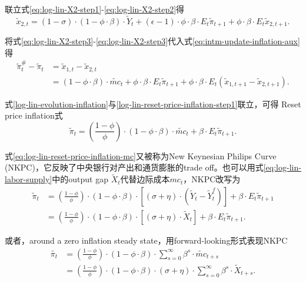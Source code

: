 联立式\eqref{eq:log-lin-X2-step1}-\eqref{eq:log-lin-X2-step2}得
\begin{equation}
  \label{eq:log-lin-X2-step3}
  \tilde{x}_{2,t} = (1-\sigma) \cdot (1-\phi \cdot \beta) \cdot \tilde{Y}_t+ (\epsilon - 1) \cdot \phi \cdot \beta \cdot E_t \tilde{\pi}_{t+1} + \phi \cdot \beta \cdot E_t \tilde{x}_{2,t+1}.
\end{equation}

将式\eqref{eq:log-lin-X2-step3}-\eqref{eq:log-lin-X2-step3}代入式\eqref{eq:intm-update-inflation-aux}得
\begin{align}
\label{log-lin-reset-price-inflation-step1}
  \tilde{\pi}^{\#}_t - \tilde{\pi}_t &= \tilde{x}_{1,t}-\tilde{x}_{2,t} \nonumber \\
                     &=(1-\phi \cdot \beta) \cdot \tilde{mc}_t + \phi \cdot \beta \cdot E_t \tilde{\pi}_{t+1} + \phi \cdot \beta \cdot E_t \left(\tilde{x}_{1,t+1} - \tilde{x}_{2,t+1} \right).
\end{align}

式\eqref{log-lin-evolution-inflation}与\eqref{log-lin-reset-price-inflation-step1}联立，可得 Reset price inflation式
\begin{equation}
  \label{eq:log-lin-reset-price-inflation-mc}
  \tilde{\pi}_t = \left(\frac{1-\phi}{\phi}\right) \cdot (1-\phi \cdot \beta) \cdot \tilde{mc}_{t} + \beta \cdot E_t \tilde{\pi}_{t+1}.
\end{equation}

式\eqref{eq:log-lin-reset-price-inflation-mc}又被称为New Keynesian Philips Curve (NKPC)，它反映了中央银行对产出和通货膨胀的trade off。也可以用式\eqref{eq:log-lin-labor-supply}中的output gap $\tilde{X}_t$代替边际成本$mc_{t}$，NKPC改写为
\begin{align}
  \label{eq:log-lin-reset-price-inflation-gap}
  \tilde{\pi}_t &= \left(\frac{1-\phi}{\phi}\right) \cdot (1-\phi \cdot \beta) \cdot \left[(\sigma + \eta) \cdot \left(\tilde{Y}_t - \tilde{Y}_t^f \right)\right] + \beta \cdot E_t \tilde{\pi}_{t+1}\nonumber \\
                &= \left(\frac{1-\phi}{\phi}\right) \cdot (1-\phi \cdot \beta) \cdot \left[(\sigma + \eta) \cdot \tilde{X}_t \right] + \beta \cdot E_t \tilde{\pi}_{t+1}.
\end{align}

或者，around a zero inflation steady state，用forward-looking形式表现NKPC
\begin{align}
  \label{eq:log-lin-reset-price-inflation-4ward-mc}
  \tilde{\pi_t} &= \left(\frac{1-\phi}{\phi}\right) \cdot (1-\phi \cdot \beta) \cdot \sum_{s=0}^{\infty} \beta^s \cdot \tilde{mc}_{t+s} \\
  \label{eq:log-lin-reset-price-inflation-4ward-gap}
                &= \left(\frac{1-\phi}{\phi}\right) \cdot (1-\phi \cdot \beta) \cdot (\sigma +\eta) \cdot \sum_{s=0}^{\infty} \beta^s \cdot \tilde{X}_{t+s}.
\end{align}

